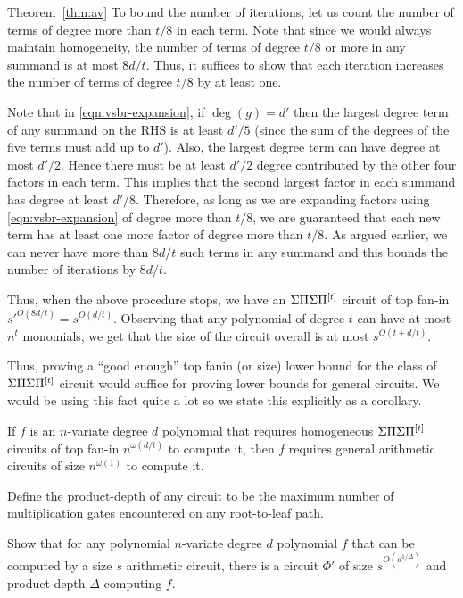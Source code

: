 \begin{proofof}{Theorem~\ref{thm:av}}
To bound the number of iterations, let us count the number of terms of degree more than $t/8$ in each term. Note that since we would always maintain homogeneity, the number of terms of degree  $t/8$ or more in any summand  is at most $8d/t$. Thus, it suffices to show that each iteration increases the number of terms of degree $t/8$ by at least one. 

Note that in \eqref{eqn:vsbr-expansion}, if $\deg(g) = d'$ then the largest degree term of any summand on the RHS is at least $d'/5$ (since the sum of the degrees of the five terms must add up to $d'$). Also, the largest degree term can have degree at most $d'/2$. Hence there must be at least $d'/2$ degree contributed by the other four factors in each term. This implies that the second largest factor in each summand has degree at least $d'/8$. Therefore, as long as we are expanding factors using \eqref{eqn:vsbr-expansion} of degree more than $t/8$, we are guaranteed that each new term has at least one more factor of degree more than $t/8$. As argued earlier, we can never have more than $8d/t$ such terms in any summand and this bounds the number of iterations by $8d/t$. 

Thus, when the above procedure stops, we have an $\Sigma\Pi\Sigma\Pi^{[t]}$ circuit of top fan-in $s'^{O(8d/t)} = s^{O(d/t)}$. Observing that any polynomial of degree $t$ can have at most $n^t$ monomials, we get that the size of the circuit overall is at most $s^{O(t + d/t)}$. 
\end{proofof}

Thus, proving a ``good enough'' top fanin (or size) lower bound for the class of $\Sigma\Pi\Sigma\Pi^{[t]}$ circuit would suffice for proving lower bounds for general circuits. We would be using this fact quite a lot so we state this explicitly as a corollary. 

\begin{corollary}\label{cor:av}
If $f$ is an $n$-variate degree $d$ polynomial that requires homogeneous $\Sigma\Pi\Sigma\Pi^{[t]}$ circuits of top fan-in $n^{\omega(d/t)}$ to compute it, then $f$ requires general arithmetic circuits of size $n^{\omega(1)}$ to compute it. 
\end{corollary}

\begin{exercise}
Define the product-depth of any circuit to be the maximum number of multiplication gates encountered on any root-to-leaf path. 

Show that for any polynomial $n$-variate degree $d$ polynomial $f$ that can be computed by a size $s$ arithmetic circuit, there is a circuit $\Phi'$ of size $s^{O(d^{1/\Delta})}$ and product depth $\Delta$ computing $f$. 
\end{exercise}

